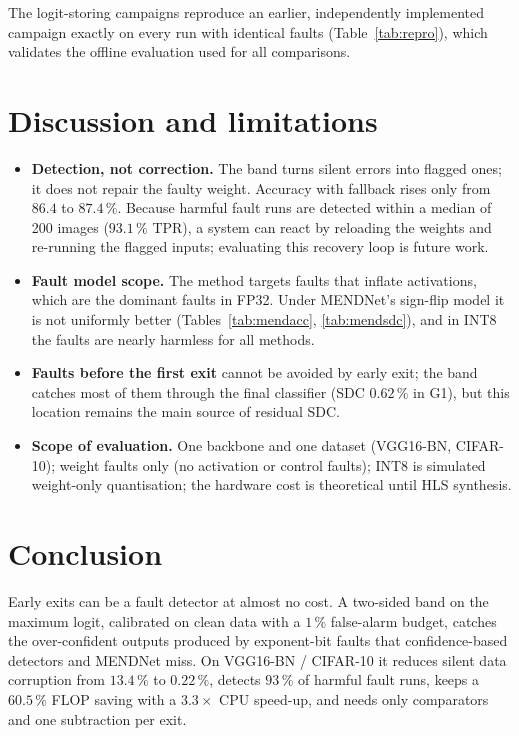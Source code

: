 \documentclass[10pt,a4paper]{article}
\begin{document}
The logit-storing campaigns reproduce an earlier, independently implemented campaign exactly on every run with
identical faults (Table~\ref{tab:repro}), which validates the offline evaluation used for all comparisons.

\section{Discussion and limitations}\label{sec:disc}

\begin{itemize}
  \item \textbf{Detection, not correction.} The band turns silent errors into flagged ones; it does not repair
        the faulty weight. Accuracy with fallback rises only from $86.4$ to $87.4\,\%$. Because harmful fault
        runs are detected within a median of 200 images ($93.1\,\%$ TPR), a system can react by reloading the
        weights and re-running the flagged inputs; evaluating this recovery loop is future work.
  \item \textbf{Fault model scope.} The method targets faults that inflate activations, which are the dominant
        faults in FP32. Under MENDNet's sign-flip model it is not uniformly better (Tables~\ref{tab:mendacc},
        \ref{tab:mendsdc}), and in INT8 the faults are nearly harmless for all methods.
  \item \textbf{Faults before the first exit} cannot be avoided by early exit; the band catches most of them
        through the final classifier (SDC $0.62\,\%$ in G1), but this location remains the main source of
        residual SDC.
  \item \textbf{Scope of evaluation.} One backbone and one dataset (VGG16-BN, CIFAR-10); weight faults only
        (no activation or control faults); INT8 is simulated weight-only quantisation; the hardware cost is
        theoretical until HLS synthesis.
\end{itemize}

\section{Conclusion}

Early exits can be a fault detector at almost no cost. A two-sided band on the maximum logit, calibrated on
clean data with a $1\,\%$ false-alarm budget, catches the over-confident outputs produced by exponent-bit faults
that confidence-based detectors and MENDNet miss. On VGG16-BN / CIFAR-10 it reduces silent data corruption from
$13.4\,\%$ to $0.22\,\%$, detects $93\,\%$ of harmful fault runs, keeps a $60.5\,\%$ FLOP saving with a
$3.3\times$ CPU speed-up, and needs only comparators and one subtraction per exit.
\end{document}
